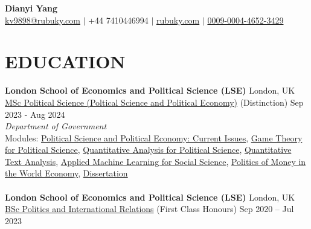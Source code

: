 \documentclass[a4paper,9pt]{extarticle}
\begin{document}
\pagestyle{empty}

\begin{center}
\textbf{\huge Dianyi Yang}\\[2pt] %
\label{CV}
\href{mailto:kv9898@rubuky.com}{kv9898@rubuky.com} $\mid$ +44 7410446994 $\mid$ \href{https://www.rubuky.com/}{rubuky.com} $\mid$ \href{https://orcid.org/0009-0004-4652-3429}{0009-0004-4652-3429} %
\end{center}

\section*{EDUCATION}
\noindent
\textbf{London School of Economics and Political Science (LSE)} \hfill London, UK \\ \href{https://www.lse.ac.uk/resources/calendar2023-2024/programmeRegulations/taughtMasters/2023/MScPoliticalSciencePoliticalScienceAndPoliticalEconomy.htm}{MSc Political Science (Poltical Science and Political Economy)}  (Distinction)  \hfill Sep 2023 - Aug 2024\\ %
\textit{Department of Government}\vspace{0.1cm}\\ %
Modules: \href{https://www.lse.ac.uk/resources/calendar2023-2024/courseGuides/GV/2023_GV482.htm}{Political Science and Political Economy: Current Issues}, \href{https://www.lse.ac.uk/resources/calendar2023-2024/courseGuides/GV/2023_GV4C8.htm}{Game Theory for Political Science}, \href{https://www.lse.ac.uk/resources/calendar2023-2024/courseGuides/GV/2023_GV481.htm}{Quantitative Analysis for Political Science}, \href{https://www.lse.ac.uk/resources/calendar2023-2024/courseGuides/MY/2023_MY459.htm}{Quantitative Text Analysis}, \href{https://www.lse.ac.uk/resources/calendar2023-2024/courseGuides/MY/2023_MY474.htm}{Applied Machine Learning for Social Science}, 
\href{https://www.lse.ac.uk/resources/calendar2023-2024/courseGuides/IR/2023_IR469.htm}{Politics of Money in the World Economy}, \href{https://www.lse.ac.uk/resources/calendar2023-2024/courseGuides/GV/2023_GV499.htm}{Dissertation}
\\~\\
\noindent
\textbf{London School of Economics and Political Science (LSE)} \hfill London, UK \\ \href{https://www.lse.ac.uk/resources/calendar2023-2024/programmeRegulations/undergraduate/2020/BScPoliticsAndInternationalRelations.htm}{BSc Politics and International Relations} (First Class Honours) \hfill Sep 2020 – Jul 2023 \\
\end{document}

